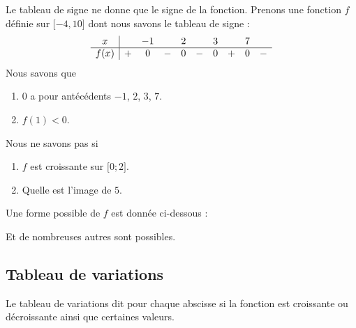 Le tableau de signe ne donne que le signe de la fonction. Prenons une fonction \( f\) définie sur \( \mathopen[ -4 , 10 \mathclose]\) dont nous savons le tableau de signe :
\begin{equation*}
    \begin{array}[]{c|ccccccccc}
        x&&-1&&2&&3&&7&\\
        \hline
        f(x)&+&0&-&0&-&0&+&0&-\\
    \end{array}
\end{equation*}
Nous savons que
\begin{enumerate}
    \item
        \( 0\) a pour antécédents \( -1\), \( 2\), \( 3\), \( 7\).
    \item
        \( f(1)<0\).
\end{enumerate}
Nous ne savons pas si 
\begin{enumerate}
    \item
        \( f\) est croissante sur \( \mathopen[ 0 ; 2 \mathclose]\).
    \item
        Quelle est l'image de \( 5\).
\end{enumerate}

Une forme possible de \( f\) est donnée ci-dessous :
\begin{center}

\end{center}

Et de nombreuses autres sont possibles.

\subsection{Tableau de variations}

Le tableau de variations dit pour chaque abscisse si la fonction est croissante ou décroissante ainsi que certaines valeurs.

